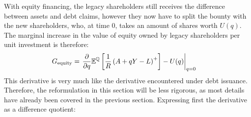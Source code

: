 \documentclass[../main.tex]{subfiles}
\begin{document}
        With equity financing, the legacy shareholders still receives the difference between assets and debt claims,
        however they now have to split the bounty with the new shareholders, 
        who, at time 0, takes an amount of shares worth $U(q)$. 
        The marginal increase in the value of equity owned by legacy shareholders per unit investment is therefore:
            \begin{align}
                G_{\text{equity}} &=
                    \left.
                    \frac{
                        \partial 
                    }{
                        \partial 
                        q
                    }
                    \mathbb{E}^{\mathbb{Q}}\left[
                        \frac{1}{R} 
                        \left(
                            A + qY - L
                        \right)^{+}
                    \right]
                    -
                    U(q) 
                    \right\rvert_{q=0} 
                    \nonumber
            \end{align}
        This derivative is very much like the derivative encountered under debt issuance.
        Therefore, the reformulation in this section will be less rigorous,
        as most details have already been covered in the previous section.
        Expressing first the derivative as a difference quotient:
\end{document}
